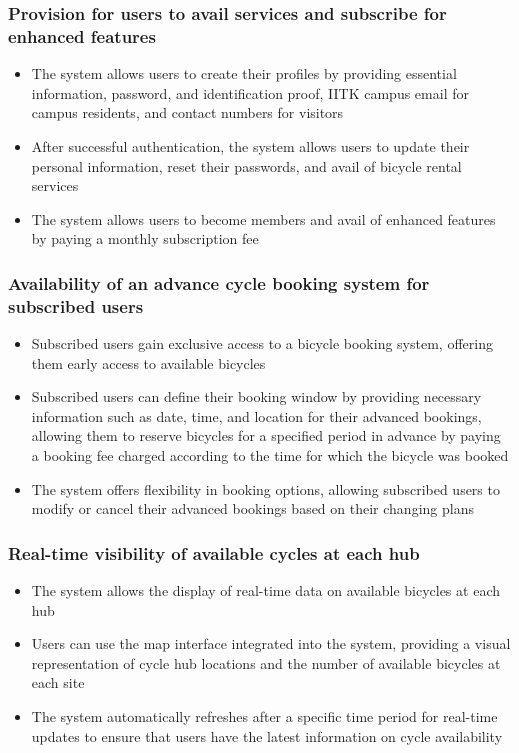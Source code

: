 \documentclass[11pt]{article}
\begin{document}
\subsubsection{Provision for users to avail services and subscribe for enhanced features}
\begin{itemize}
    \item The system allows users to create their profiles by providing essential information, password, and identification proof, IITK campus email for campus residents, and contact numbers for visitors
    \item After successful authentication, the system allows users to update their personal information, reset their passwords, and avail of bicycle rental services
    \item The system allows users to become members and avail of enhanced features by paying a monthly subscription fee
\end{itemize}

\subsubsection{Availability of an advance cycle booking system for subscribed users}
\begin{itemize}
    \item Subscribed users gain exclusive access to a bicycle booking system, offering them early access to available bicycles
    \item Subscribed users can define their booking window by providing necessary information such as date, time, and location for their advanced bookings, allowing them to reserve bicycles for a specified period in advance by paying a booking fee charged according to the time for which the bicycle was booked
    \item The system offers flexibility in booking options, allowing subscribed users to modify or cancel their advanced bookings based on their changing plans
\end{itemize}

\subsubsection{Real-time visibility of available cycles at each hub}
\begin{itemize}
    \item The system allows the display of real-time data on available bicycles at each hub
    \item Users can use the map interface integrated into the system, providing a visual representation of cycle hub locations and the number of available bicycles at each site
    \item The system automatically refreshes after a specific time period for real-time updates to ensure that users have the latest information on cycle availability
\end{itemize}
\end{document}
